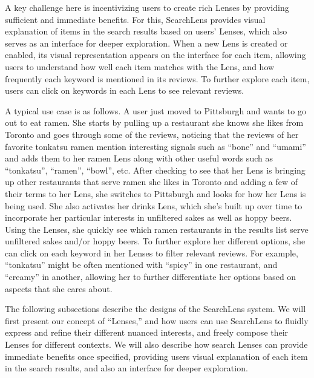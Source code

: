 A key challenge here is incentivizing users to create rich Lenses by providing sufficient and immediate benefits. For this, SearchLens provides visual explanation of items in the search results based on users' Lenses, which also serves as an interface for deeper exploration. When a new Lens is created or enabled, its visual representation appears on the interface for each item, allowing users to understand how well each item matches with the Lens, and how frequently each keyword is mentioned in its reviews. To further explore each item, users can click on keywords in each Lens to see relevant reviews.

A typical use case is as follows. A user just moved to Pittsburgh and wants to go out to eat ramen. She starts by pulling up a restaurant she knows she likes from Toronto and goes through some of the reviews, noticing that the reviews of her favorite tonkatsu ramen mention interesting signals such as ``bone'' and ``umami'' and adds them to her ramen Lens along with other useful words such as ``tonkatsu'', ``ramen'', ``bowl'', etc. After checking to see that her Lens is bringing up other restaurants that serve ramen she likes in Toronto and adding a few of their terms to her Lens, she switches to Pittsburgh and looks for how her Lens is being used.  She also activates her drinks Lens, which she's built up over time to incorporate her particular interests in unfiltered sakes as well as hoppy beers. Using the Lenses, she quickly see which ramen restaurants in the results list serve unfiltered sakes and/or hoppy beers. To further explore her different options, she can click on each keyword in her Lenses to filter relevant reviews. For example, ``tonkatsu'' might be often mentioned with ``spicy'' in one restaurant, and ``creamy'' in another, allowing her to further differentiate her options based on aspects that she cares about.

The following subsections describe the designs of the SearchLens system. We will first present our concept of ``Lenses,'' and how users can use SearchLens to fluidly express and refine their different nuanced interests, and freely compose their Lenses for different contexts. We will also describe how search Lenses can provide immediate benefits once specified, providing users visual explanation of each item in the search results, and also an interface for deeper exploration.


